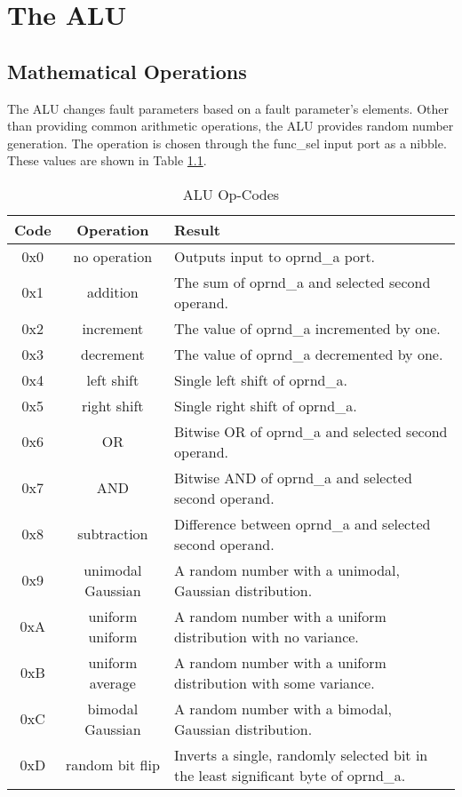 \documentclass[]{report}
\begin{document}
\chapter{The ALU}
\label{c: the alu}

\section{Mathematical Operations}
The ALU changes fault parameters based on a fault parameter's elements. Other than providing common arithmetic operations, the ALU provides random number generation. The operation is chosen through the func\_sel input port as a nibble. These values are shown in Table \ref{table: alu op-codes}.
\begin{table}[h]
	\centering
	\caption{ALU Op-Codes}
	\label{table: alu op-codes}
	\begin{tabular}{|c|c|l|}
		\hline 
		Code & Operation & Result \\ 
		\hline 
		0x0 & no operation & Outputs input to oprnd\_a port. \\
		\hline
		0x1 & addition & The sum of oprnd\_a and selected second operand. \\
		\hline
		0x2 & increment & The value of oprnd\_a incremented by one. \\
		\hline
		0x3 & decrement & The value of oprnd\_a decremented by one. \\
		\hline
		0x4 & left shift & Single left shift of oprnd\_a. \\
		\hline
		0x5 & right shift & Single right shift of oprnd\_a. \\
		\hline
		0x6 & OR & Bitwise OR of oprnd\_a and selected second operand.\\
		\hline
		0x7 & AND & Bitwise AND of oprnd\_a and selected second operand.\\
		\hline
		0x8 & subtraction & Difference between oprnd\_a and selected second operand.\\
		\hline
		0x9 & unimodal Gaussian & A random number with a unimodal, Gaussian distribution.\\
		\hline
		0xA & uniform uniform & A random number with a uniform distribution with no variance.\\
		\hline
		0xB & uniform average & A random number with a uniform distribution with some variance. \\
		\hline
		0xC & bimodal Gaussian & A random number with a bimodal, Gaussian distribution.\\
		\hline
		0xD & random bit flip & Inverts a single, randomly selected bit in the least significant byte of oprnd\_a.\\
		\hline 
	\end{tabular} 
\end{table}
\end{document}
